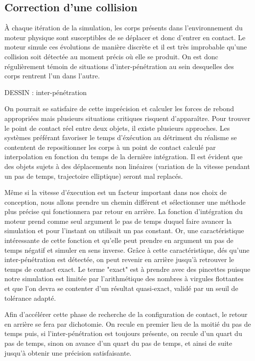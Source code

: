 \subsection{Correction d'une collision}

\`A chaque itération de la simulation, les corps présents dans
l'environnement du moteur physique sont susceptibles de se déplacer et
donc d'entrer en contact. Le moteur simule ces évolutions de manière
discrète et il est très improbable qu'une collision soit détectée au
moment précis o\`u elle se produit. On est donc régulièrement témoin
de situations d'inter-pénétration au sein desquelles des corps
rentrent l'un dans l'autre.

DESSIN : inter-pénétration

On pourrait se satisfaire de cette imprécision et calculer les forces
de rebond appropriées mais plusieurs situations critiques risquent
d'apparaître. Pour trouver le point de contact réel entre deux objets,
il existe plusieurs approches. Les systèmes préférant favoriser le
temps d'éxécution au détriment du réalisme se contentent de
repositionner les corps à un point de contact calculé par
interpolation en fonction du temps de la dernière intégration. Il est
évident que des objets sujets à des déplacements non linéaires
(variation de la vitesse pendant un pas de temps, trajectoire
elliptique) seront mal replacés.

Même si la vitesse d'éxecution est un facteur important dans nos choix
de conception, nous allons prendre un chemin différent et sélectionner
une méthode plus précise qui fonctionnera par retour en arrière. La
fonction d'intégration du moteur prend comme seul argument le pas de
temps duquel faire avancer la simulation et pour l'instant on
utilisait un pas constant. Or, une caractéristique intéressante de
cette fonction et qu'elle peut prendre en argument un pas de temps
négatif et simuler en sens inverse. Grâce à cette caractéristique, dés
qu'une inter-pénétration est détectée, on peut revenir en arrière
jusqu'à retrouver le temps de contact exact. Le terme "exact" est à
prendre avec des pincettes puisque notre simulation est limitée par
l'arithmétique des nombres à virgules flottantes et que l'on devra se
contenter d'un résultat quasi-exact, validé par un seuil de tolérance
adapté.

Afin d'accélérer cette phase de recherche de la configuration de
contact, le retour en arrière se fera par dichotomie. On recule en
premier lieu de la moitié du pas de temps puis, si l'inter-pénétration
est toujours présente, on recule d'un quart du pas de temps, sinon on
avance d'un quart du pas de temps, et ainsi de suite jusqu'à obtenir
une précision satisfaisante.

